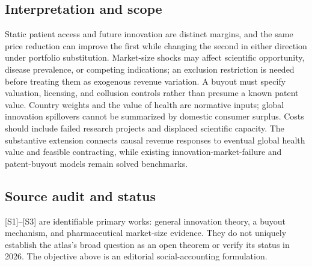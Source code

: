 \documentclass[11pt,a4paper]{article}
\begin{document}
\subsection*{Interpretation and scope}
Static patient access and future innovation are distinct margins, and the same price reduction can improve the first while changing the second in either direction under portfolio substitution. Market-size shocks may affect scientific opportunity, disease prevalence, or competing indications; an exclusion restriction is needed before treating them as exogenous revenue variation. A buyout must specify valuation, licensing, and collusion controls rather than presume a known patent value. Country weights and the value of health are normative inputs; global innovation spillovers cannot be summarized by domestic consumer surplus. Costs should include failed research projects and displaced scientific capacity. The substantive extension connects causal revenue responses to eventual global health value and feasible contracting, while existing innovation-market-failure and patent-buyout models remain solved benchmarks.

\subsection*{Source audit and status}
[S1]--[S3] are identifiable primary works: general innovation theory, a buyout mechanism, and pharmaceutical market-size evidence. They do not uniquely establish the atlas's broad question as an open theorem or verify its status in 2026. The objective above is an editorial social-accounting formulation.
\end{document}
